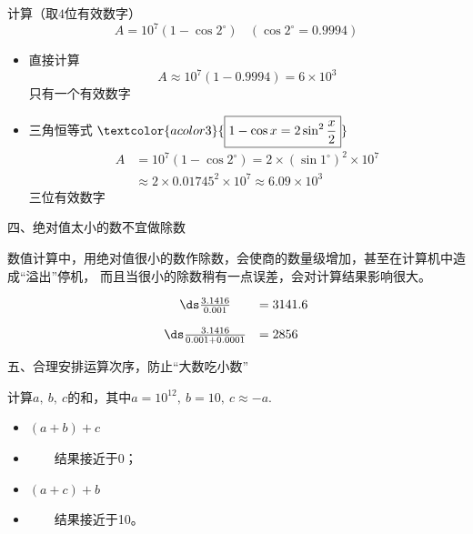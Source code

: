 %
\begin{frame} 

\begin{li}
计算（取$4$位有效数字）
$$
A = 10^7(1-\cos 2^{\circ}) ~~~~ (\cos 2^{\circ} = 0.9994)
$$
\end{li}

\pause 
\begin{itemize}
\item
\textcolor{acolor5}{直接计算}
$$
A \approx 10^7(1-0.9994)  = 6 \times 10^3
$$
只有一个有效数字\\[0.2cm]\pause
\item
\textcolor{acolor5}{三角恒等式}
$\textcolor{acolor3}{\boxed{
  1 - \cos x = 2 \sin^2 \frac x2 
}}
$
$$
\begin{array}{ll}
A &= 10^7(1-\cos 2^{\circ})  = 2 \times (\sin 1^{\circ})^2 \times 10^7 \\[0.2cm]
&\approx 2 \times 0.01745^2 \times 10^7  \approx 6.09 \times 10^3
\end{array}
$$
三位有效数字
\end{itemize}
\end{frame}
%
%
\begin{frame}%

\begin{flushleft}
四、绝对值太小的数不宜做除数
\end{flushleft}
数值计算中，用绝对值很小的数作除数，会使商的数量级增加，甚至在计算机中造成“溢出”停机，
而且当很小的除数稍有一点误差，会对计算结果影响很大。
\pause 
\begin{li}
$$
\begin{array}{cl}
\ds \frac{3.1416}{0.001} & = 3141.6 \\[0.4cm]
\ds \frac{3.1416}{0.001+0.0001} & = 2856 
\end{array}
$$
\end{li}

\end{frame}



\begin{frame} 

\begin{flushleft}
五、合理安排运算次序，防止“大数吃小数”
\end{flushleft}

\begin{li}
计算$a, ~b, ~c$的和，其中$a = 10^{12}, ~b = 10, ~c \approx -a$.
\end{li}
\pause 

\begin{itemize}
\item
$(a+b)+c$
\item[]
~~~~结果接近于0； \pause
\item
$(a+c)+b$
\item[]
~~~~结果接近于10。
\end{itemize}

 
\end{frame}
